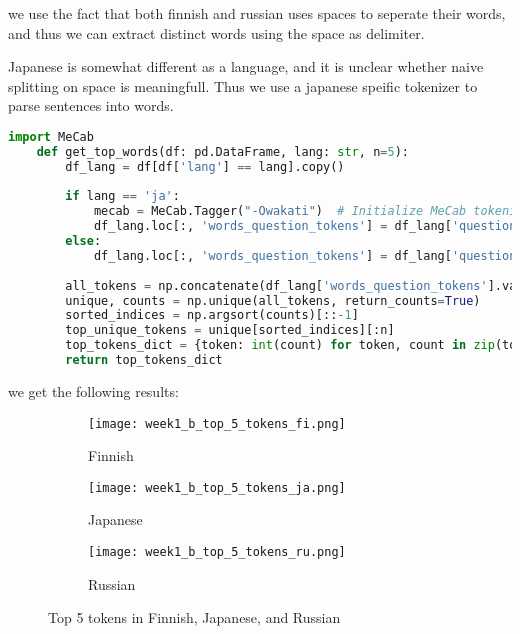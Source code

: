 \documentclass[11pt]{article}
\begin{document}
\begin{enumerate}
    we use the fact that both finnish and russian uses spaces to seperate their words, and thus we can extract distinct words using the space as delimiter.

    Japanese is somewhat different as a language, and it is unclear whether naive splitting on space is meaningfull. 
    Thus we use a japanese speific tokenizer to parse sentences into words.

    \begin{lstlisting}[language=Python]
    import MeCab
    def get_top_words(df: pd.DataFrame, lang: str, n=5):
        df_lang = df[df['lang'] == lang].copy()
        
        if lang == 'ja':
            mecab = MeCab.Tagger("-Owakati")  # Initialize MeCab tokenizer
            df_lang.loc[:, 'words_question_tokens'] = df_lang['question'].apply(lambda x: mecab.parse(x).split())
        else:
            df_lang.loc[:, 'words_question_tokens'] = df_lang['question'].apply(lambda x: x.split(' '))
        
        all_tokens = np.concatenate(df_lang['words_question_tokens'].values)
        unique, counts = np.unique(all_tokens, return_counts=True)
        sorted_indices = np.argsort(counts)[::-1]
        top_unique_tokens = unique[sorted_indices][:n]
        top_tokens_dict = {token: int(count) for token, count in zip(top_unique_tokens, counts[sorted_indices][:n])}
        return top_tokens_dict
    \end{lstlisting}


    we get the following results:

    \begin{figure}[t]
        \centering
        \begin{subfigure}[b]{0.1\textwidth}
            \centering
            \texttt{[image: week1\_b\_top\_5\_tokens\_fi.png]}
            \caption{Finnish}
            \label{fig:top_5_tokens_fi}
        \end{subfigure}
        \hfill
        \begin{subfigure}[b]{0.1\textwidth}
            \centering
            \texttt{[image: week1\_b\_top\_5\_tokens\_ja.png]}
            \caption{Japanese}
            \label{fig:top_5_tokens_ja}
        \end{subfigure}
        \hfill
        \begin{subfigure}[b]{0.1\textwidth}
            \centering
            \texttt{[image: week1\_b\_top\_5\_tokens\_ru.png]}
            \caption{Russian}
            \label{fig:top_5_tokens_ru}
        \end{subfigure}
        \caption{Top 5 tokens in Finnish, Japanese, and Russian}
        \label{fig:top_5_tokens_all}
    \end{figure}


\end{enumerate}
\end{document}
